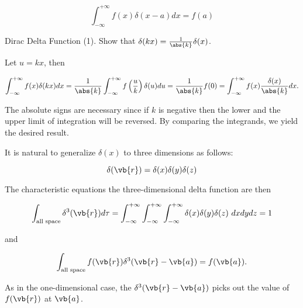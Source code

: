 \documentclass[english,a4paper,12pt]{report}
\begin{document}
\begin{equation} 
	\int_{-\infty}^{+\infty} f(x) \delta(x-a) dx = f(a) 
\end{equation}
	
\example
{Dirac Delta Function (1).}
{Show that \(\delta(kx) = \frac{1}{\abs{k}}\delta(x)\).}
{Let \(u = kx\), then 
			
\begin{equation} 
	\int_{-\infty}^{+\infty} f(x) \delta(kx) dx = \frac{1}{\abs{k} }  \int_{-\infty}^{+\infty} f\left(\frac{u}{k}\right) \delta(u) du = \frac{1}{\abs{k}} f(0) = \int_{-\infty}^{+\infty} f(x) \frac{\delta(x)}{\abs{k}} dx.
\end{equation}
			
The absolute signs are necessary since if \(k\) is negative then the lower and the upper limit of integration will be reversed. By comparing the integrands, we yield the desired result.}	
		


It is natural to generalize \(\delta(x)\) to three dimensions as follows:
	
\begin{equation} 
	\delta(\vb{r}) = \delta(x)\delta(y)\delta(z) 
\end{equation}
	
The characteristic equations the three-dimensional delta function are then 
	

\begin{equation} 
	\int_{\text{all space} } \delta^3(\vb{r})
	d\tau = \int_{-\infty}^{+\infty}\int_{-\infty}^{+\infty}\int_{-\infty}^{+\infty} \delta(x)\delta(y)\delta(z) ~dxdydz = 1 
\end{equation}
	
and
	
\begin{equation} 
	\int_{\text{all space} } f(\vb{r}) \delta^3(\vb{r} - \vb{a}) = f(\vb{a}). 
\end{equation} 
	
As in the one-dimensional case, the \(\delta^3(\vb{r} - \vb{a})\) picks out the value of \(f(\vb{r})\) at \(\vb{a}\).
	
\end{document}
